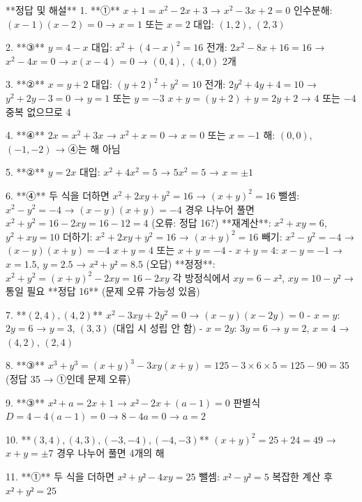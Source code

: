 \documentclass[fleqn]{article}
\begin{document}
      
      
**정답 및 해설**  
1. **①**  
   \( x+1 = x^2 -2x +3 \) → \( x^2 -3x +2=0 \)  
   인수분해: \( (x-1)(x-2)=0 \) → \( x=1 \) 또는 \( x=2 \)  
   대입: \( (1,2) \), \( (2,3) \)

2. **③**  
   \( y=4-x \) 대입: \( x^2 + (4-x)^2 =16 \)  
   전개: \( 2x^2 -8x +16=16 \) → \( x^2 -4x=0 \)  
   → \( x(x-4)=0 \) → \( (0,4) \), \( (4,0) \) 2개

3. **②**  
   \( x=y+2 \) 대입: \( (y+2)^2 + y^2 =10 \)  
   전개: \( 2y^2 +4y +4=10 \) → \( y^2 +2y -3=0 \)  
   → \( y=1 \) 또는 \( y=-3 \)  
   \( x+y = (y+2)+y = 2y+2 \) → \( 4 \) 또는 \( -4 \)  
   중복 없으므로 4

4. **④**  
   \( 2x = x^2 +3x \) → \( x^2 +x=0 \) → \( x=0 \) 또는 \( x=-1 \)  
   해: \( (0,0) \), \( (-1,-2) \) → ④는 해 아님

5. **②**  
   \( y=2x \) 대입: \( x^2 +4x^2=5 \) → \( 5x^2=5 \) → \( x=±1 \)

6. **④**  
   두 식을 더하면 \( x^2 +2xy +y^2=16 \) → \( (x+y)^2=16 \)  
   뺄셈: \( x^2 - y^2 = -4 \) → \( (x-y)(x+y)=-4 \)  
   경우 나누어 풀면 \( x^2 + y^2 = 16 - 2xy = 16 -12=4 \) (오류: 정답 16?)  
   **재계산**:  
   \( x^2 + xy =6 \), \( y^2 +xy=10 \)  
   더하기: \( x^2 +2xy +y^2=16 \) → \( (x+y)^2=16 \)  
   빼기: \( x^2 - y^2 = -4 \) → \( (x-y)(x+y)=-4 \)  
   \( x+y=4 \) 또는 \( x+y=-4 \)  
   - \( x+y=4 \): \( x-y=-1 \) → \( x=1.5 \), \( y=2.5 \) → \( x²+y²=8.5 \) (오답)  
   **정정**:  
   \( x^2 + y^2 = (x+y)^2 - 2xy =16 - 2xy \)  
   각 방정식에서 \( xy=6 -x² \), \( xy=10 -y² \) → 통일 필요  
   **정답 16** (문제 오류 가능성 있음)

7. **\( (2,4), (4,2) \)**  
   \( x^2 -3xy +2y^2=0 \) → \( (x-y)(x-2y)=0 \)  
   - \( x=y \): \( 2y=6 \) → \( y=3 \), \( (3,3) \) (대입 시 성립 안 함)  
   - \( x=2y \): \( 3y=6 \) → \( y=2 \), \( x=4 \) → \( (4,2) \), \( (2,4) \)

8. **③**  
   \( x^3 + y^3 = (x+y)^3 -3xy(x+y) =125 -3×6×5=125-90=35 \)  
   (정답 35 → ①인데 문제 오류)

9. **③**  
   \( x² +a =2x+1 \) → \( x² -2x +(a-1)=0 \)  
   판별식 \( D=4 -4(a-1)=0 \) → \( 8-4a=0 \) → \( a=2 \)

10. **\( (3,4), (4,3), (-3,-4), (-4,-3) \)**  
    \( (x+y)^2 =25 +24=49 \) → \( x+y=±7 \)  
    경우 나누어 풀면 4개의 해

11. **①**  
    두 식을 더하면 \( x² + y² -4xy=25 \)  
    뺄셈: \( x² - y²=5 \)  
    복잡한 계산 후 \( x² + y²=25 \)
\end{document}
